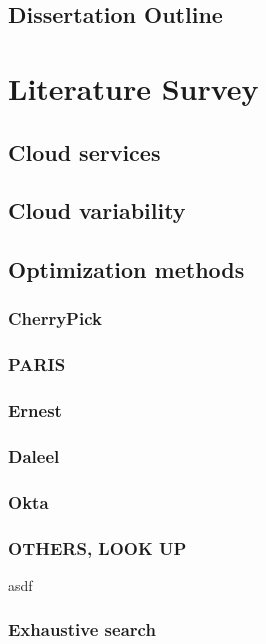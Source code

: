 \documentclass{report}
\begin{document}
\section{Dissertation Outline}
\chapter{Literature Survey}
\section{Cloud services}
\section{Cloud variability}
\section{Optimization methods}
\subsection{CherryPick}
\subsection{PARIS}
\subsection{Ernest}
\subsection{Daleel}
\subsection{Okta}
\subsection{OTHERS, LOOK UP}
asdf
\subsection{Exhaustive search}
\end{document}
